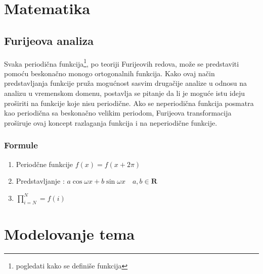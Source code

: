\documentclass[12pt,a4paper]{article}
\title{\lat{Latex}}
\author{Ime i prezime}
\begin{document}
\maketitle
\thispagestyle{empty}
\newpage
\section {Matematika}
\subsection{Furijeova analiza}
Svaka periodi\v cna funkcija\footnote{pogledati kako se defini\v se funkcija}, po teoriji Furijeovih redova, mo\v ze se predstaviti pomo\' cu beskona\v cno monogo ortogonalnih funkcija. Kako ovaj na\v cin predstavljanja funkcije pru\v za mogu\' cnost sasvim druga\v cije analize u odnosu na analizu u vremenskom domenu, postavlja se pitanje da li je mogu\' ce istu ideju pro\v siriti na funkcije koje nisu periodi\v cne. Ako se neperiodi\v cna funkcija posmatra kao periodi\v cna sa beskona\v cno velikim periodom, Furijeova transformacija pro\v siruje ovaj koncept razlaganja funkcija i na neperiodi\v cne funkcije.

\subsubsection{Formule}

\begin{enumerate}
  \item Period\v cne funkcije $f(x) = f(x +2 \pi )$
  \item Predstavljanje : $ a \cos \omega x + b \sin \omega x \quad a,b \in \mathbf{R}$
  \item $\prod_{i=N}^{N} = f(i)$
\end{enumerate}


\section{Modelovanje tema}
\end{document}
